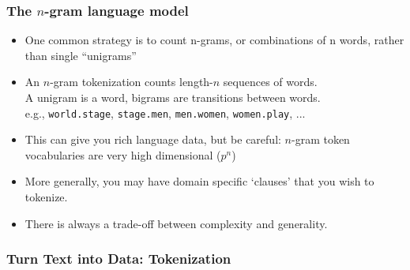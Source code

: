 \documentclass[
  shownotes,
  xcolor={svgnames},
  hyperref={colorlinks,citecolor=DarkBlue,linkcolor=DarkRed,urlcolor=DarkBlue}
  , aspectratio=169]{beamer}
\newcommand{\theme}{\color{andesred}}
\newcommand{\gr}{\color{black!60}}
\newcommand{\sg}{\color{DarkSlateGray}}
\begin{document}
\begin{frame}[fragile]
\frametitle{The $n$-gram language model}

\begin{itemize}

\item One common strategy is to count n-grams, or combinations of n words, rather than single “unigrams”

\medskip

\item An {\theme $n$-gram tokenization} counts length-$n$ sequences of words.\\
{\sg A unigram is a word, bigrams are transitions between words.}\\
{\gr e.g., {\tt world.stage}, {\tt stage.men}, {\tt men.women}, {\tt women.play}, ...}

\medskip

\item This can give you rich language data, but be careful: $n$-gram token vocabularies are very high dimensional ($p^n$)
\medskip
\item  More generally, you may have domain specific `clauses' that you wish to tokenize.
\medskip
\item  There is always a trade-off between complexity and generality. 


\end{itemize}


\end{frame}

\begin{frame}[fragile]
\frametitle{Turn Text into Data: Tokenization}



\end{frame}
\end{document}

